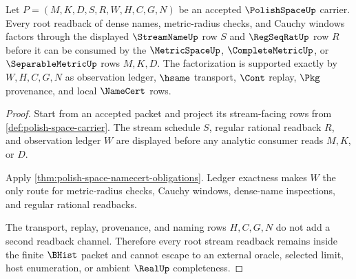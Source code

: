 \begin{theorem}
\label{thm:polishspace-root-stream-readback-obligations}
Let $P=(M,K,D,S,R,W,H,C,G,N)$ be an accepted $\PolishSpaceUp$ carrier. Every
root readback of dense names, metric-radius checks, and Cauchy windows
factors through the displayed $\StreamNameUp$ row $S$ and $\RegSeqRatUp$ row
$R$ before it can be consumed by the $\MetricSpaceUp$, $\CompleteMetricUp$,
or $\SeparableMetricUp$ rows $M,K,D$. The factorization is supported exactly
by $W,H,C,G,N$ as observation ledger, $\hsame$ transport, $\Cont$ replay,
$\Pkg$ provenance, and local $\NameCert$ rows.
\end{theorem}
\begin{proof}
Start from an accepted packet and project its stream-facing rows from
\autoref{def:polish-space-carrier}. The stream schedule $S$, regular rational
readback $R$, and observation ledger $W$ are displayed before any analytic
consumer reads $M,K$, or $D$.

Apply \autoref{thm:polish-space-namecert-obligations}. Ledger exactness makes
$W$ the only route for metric-radius checks, Cauchy windows, dense-name
inspections, and regular rational readbacks.

The transport, replay, provenance, and naming rows $H,C,G,N$ do not add a
second readback channel. Therefore every root stream readback remains inside
the finite $\BHist$ packet and cannot escape to an external oracle, selected
limit, host enumeration, or ambient $\RealUp$ completeness.
\end{proof}

